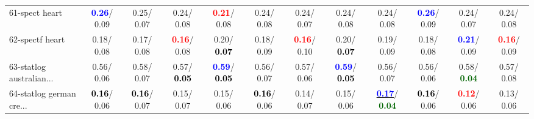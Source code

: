\begin{table}[h]
\begin{center}
{\begin{tabular}{lc|c|c|c|c|c|c|c|c|c|c}
61-spect heart & \textcolor{blue}{\textbf{  0.26}}/  0.09 &   0.25/  0.07 &   0.24/  0.08 & \textcolor{red}{\textbf{  0.21}}/  0.08 &   0.24/  0.08 &   0.24/  0.07 &   0.24/  0.08 &   0.24/  0.08 & \textcolor{blue}{\textbf{  0.26}}/  0.09 &   0.24/  0.07 &   0.24/  0.08 \\
62-spectf heart &   0.18/  0.08 &   0.17/  0.08 & \textcolor{red}{\textbf{  0.16}}/  0.08 &   0.20/\textcolor{black}{\textbf{  0.07}} &   0.18/  0.09 & \textcolor{red}{\textbf{  0.16}}/  0.10 &   0.20/\textcolor{black}{\textbf{  0.07}} &   0.19/  0.09 &   0.18/  0.08 & \textcolor{blue}{\textbf{  0.21}}/  0.09 & \textcolor{red}{\textbf{  0.16}}/  0.09 \\
63-statlog australian... &   0.56/  0.06 &   0.58/  0.07 &   0.57/\textcolor{black}{\textbf{  0.05}} & \textcolor{blue}{\textbf{  0.59}}/\textcolor{black}{\textbf{  0.05}} &   0.56/  0.07 &   0.57/  0.06 & \textcolor{blue}{\textbf{  0.59}}/\textcolor{black}{\textbf{  0.05}} &   0.56/  0.07 &   0.56/  0.06 &   0.58/\textcolor{darkgreen}{\textbf{  0.04}} &   0.57/  0.08 \\
64-statlog german cre... & \textcolor{black}{\textbf{  0.16}}/  0.06 & \textcolor{black}{\textbf{  0.16}}/  0.07 &   0.15/  0.07 &   0.15/  0.06 & \textcolor{black}{\textbf{  0.16}}/  0.06 &   0.14/  0.07 &   0.15/  0.06 & \underline{\textcolor{blue}{\textbf{  0.17}}}/\textcolor{darkgreen}{\textbf{  0.04}} & \textcolor{black}{\textbf{  0.16}}/  0.06 & \textcolor{red}{\textbf{  0.12}}/  0.06 &   0.13/  0.06 \\\end{tabular}}\label{stratsALCKappa1a5NNRedux}
\end{center}
\end{table}
